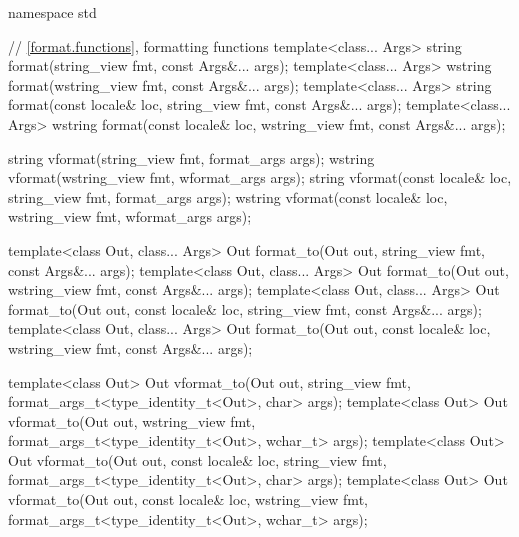 %
%
%
%
%
%
%
%
%
%
%
\begin{codeblock}
namespace std {
  // \ref{format.functions}, formatting functions
  template<class... Args>
    string format(string_view fmt, const Args&... args);
  template<class... Args>
    wstring format(wstring_view fmt, const Args&... args);
  template<class... Args>
    string format(const locale& loc, string_view fmt, const Args&... args);
  template<class... Args>
    wstring format(const locale& loc, wstring_view fmt, const Args&... args);

  string vformat(string_view fmt, format_args args);
  wstring vformat(wstring_view fmt, wformat_args args);
  string vformat(const locale& loc, string_view fmt, format_args args);
  wstring vformat(const locale& loc, wstring_view fmt, wformat_args args);

  template<class Out, class... Args>
    Out format_to(Out out, string_view fmt, const Args&... args);
  template<class Out, class... Args>
    Out format_to(Out out, wstring_view fmt, const Args&... args);
  template<class Out, class... Args>
    Out format_to(Out out, const locale& loc, string_view fmt, const Args&... args);
  template<class Out, class... Args>
    Out format_to(Out out, const locale& loc, wstring_view fmt, const Args&... args);

  template<class Out>
    Out vformat_to(Out out, string_view fmt,
                   format_args_t<type_identity_t<Out>, char> args);
  template<class Out>
    Out vformat_to(Out out, wstring_view fmt,
                   format_args_t<type_identity_t<Out>, wchar_t> args);
  template<class Out>
    Out vformat_to(Out out, const locale& loc, string_view fmt,
                   format_args_t<type_identity_t<Out>, char> args);
  template<class Out>
    Out vformat_to(Out out, const locale& loc, wstring_view fmt,
                   format_args_t<type_identity_t<Out>, wchar_t> args);

}
\end{codeblock}
